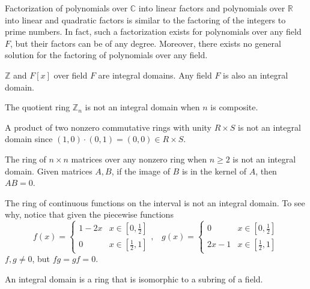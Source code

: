   Factorization of polynomials over $\mathbb{C}$ into linear factors and polynomials over $\mathbb{R}$ into linear and quadratic factors is similar to the factoring of the integers to prime numbers. In fact, such a factorization exists for polynomials over any field $F$, but their factors can be of any degree. Moreover, there exists no general solution for the factoring of polynomials over any field. 

  \begin{example}
    $\mathbb{Z}$ and $F[x]$ over field $F$ are integral domains. Any field $F$ is also an integral domain. 
  \end{example}

  \begin{example}
    The quotient ring $\mathbb{Z}_n$ is not an integral domain when $n$ is composite. 
  \end{example}

  \begin{example}
    A product of two nonzero commutative rings with unity $R \times S$ is not an integral domain since $(1,0) \cdot (0, 1) = (0, 0) \in R \times S$. 
  \end{example}

  \begin{example}
    The ring of $n \times n$ matrices over any nonzero ring when $ n \geq 2$ is not an integral domain. Given matrices $A, B$, if the image of $B$ is in the kernel of $A$, then $A B = 0$.
  \end{example}

  \begin{example}
    The ring of continuous functions on the interval is not an integral domain. To see why, notice that given the piecewise functions 
    \begin{equation}
      f (x) = \begin{cases}
      1 - 2x & x \in [0, \frac{1}{2}] \\
      0 & x \in [\frac{1}{2}, 1] 
      \end{cases}, \; \;\;g (x) = \begin{cases}
      0 & x \in [0, \frac{1}{2}] \\
      2x - 1 & x \in [\frac{1}{2}, 1] 
      \end{cases}
    \end{equation}
    $f, g \neq 0$, but $f g = g f = 0$. 
  \end{example}

  \begin{theorem}
    An integral domain is a ring that is isomorphic to a subring of a field. 
  \end{theorem}


